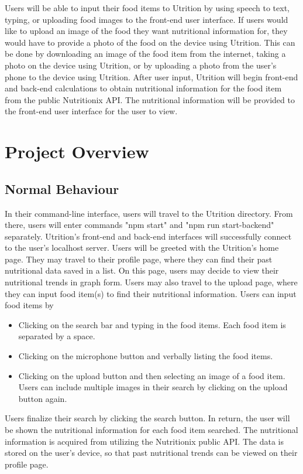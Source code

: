 \documentclass[12pt, titlepage]{article}
\begin{document}
Users will be able to input their food items to Utrition by using speech to text, typing, or uploading food images to the front-end user interface. If users would like to upload an image of the food they want nutritional information for, they would have to provide a photo of the food on the device using Utrition. This can be done by downloading an image of the food item from the internet, taking a photo on the device using Utrition, or by uploading a photo from the user's phone to the device using Utrition. After user input, Utrition will begin front-end and back-end calculations to obtain nutritional information for the food item from the public Nutritionix API. The nutritional information will be provided to the front-end user interface for the user to view.


\section{Project Overview}

\subsection{Normal Behaviour}

In their command-line interface, users will travel to the Utrition directory. From there, users will enter commands "npm start" and "npm run start-backend" separately. Utrition's front-end and back-end interfaces will successfully connect to the user's localhost server. Users will be greeted with the Utrition's home page. They may travel to their profile page, where they can find their past nutritional data saved in a list. On this page, users may decide to view their nutritional trends in graph form. Users may also travel to the upload page, where they can input food item(s) to find their nutritional information. Users can input food items by 
\begin{itemize}
	\item Clicking on the search bar and typing in the food items. Each food item is separated by a space.
	\item Clicking on the microphone button and verbally listing the food items.
	\item Clicking on the upload button and then selecting an image of a food item. Users can include multiple images in their search by clicking on the upload button again.
\end{itemize}
Users finalize their search by clicking the search button. In return, the user will be shown the nutritional information for each food item searched. The nutritional information is acquired from utilizing the Nutritionix public API. The data is stored on the user's device, so that past nutritional trends can be viewed on their profile page.
\end{document}
